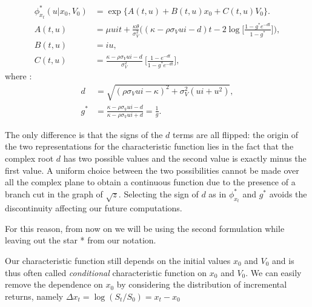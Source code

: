 \begin{subequations}
\begin{align}
\label{eq:heston_chf_trap}
\phi_{x_t}^*(u| x_0, V_0) &= \exp\{A(t,u) + B(t,u) x_0 + C(t,u) V_0\}.\nonumber\\
A(t,u) &= \mu u i t +  \frac{\kappa\theta}{\sigma_V^2} \bigg( (\kappa - \rho\sigma_V u i - d)t - 2 \log\Big[  \frac{1-g^*e^{-dt}}{1-g^*} \Big] \bigg),\\
B(t,u) &= i u ,\\
C(t,u)&= \frac{\kappa - \rho\sigma_V u i - d}{\sigma_V^2} \:\Big[\frac{1-e^{-dt}}{1-g^*e^{-dt}}\Big],
\end{align}
\end{subequations} 
where :
\begin{equation*}
\begin{split}
d&=\sqrt{(\rho \sigma_V u i - \kappa)^2 + \sigma_V^2(u i + u^2)},\\
g^*&= \frac{\kappa - \rho\sigma_V u i - d}{\kappa - \rho\sigma_V u i + d} = \frac{1}{g}.
\end{split}
\end{equation*} 

The only difference is that the signs of the $d$ terms are all flipped: the origin of the two representations for the characteristic function lies in the fact that the complex root $d$ has two possible values and the second value is exactly minus the first value.
A uniform choice between the two possibilities cannot be made over all the complex plane to obtain a continuous function due to the presence of a branch cut in the graph of $\sqrt{z}$. Selecting the sign of $d$ as in $\phi_{x_t}^*$ and $g^*$ avoids the discontinuity affecting our future computations.

For this reason, from now on we will be using the second formulation while leaving out the star * from our notation.

\bigskip


Our characteristic function still depends on the initial values $x_0$ and  $V_0$ and is thus often called \textit{conditional} characteristic function on $x_0$ and $V_0$.
We can easily remove the dependence on $x_0$ by considering the distribution of incremental returns, namely $\Delta x_t = \log (S_t / S_0) = x_t - x_0$

